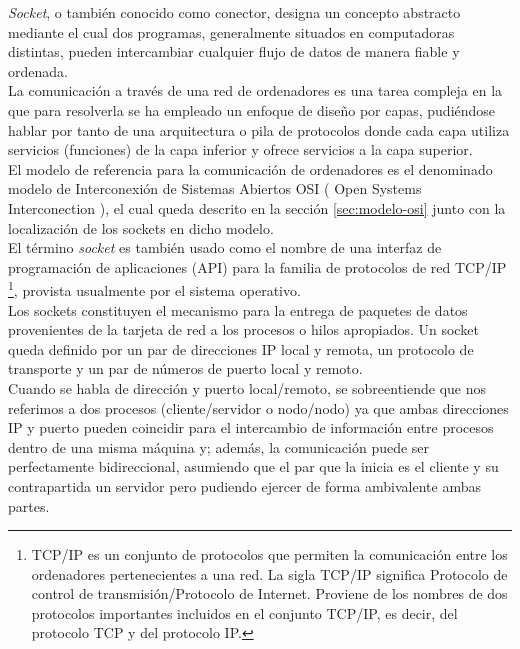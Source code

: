 \emph{Socket}, o también conocido como conector, designa un concepto abstracto mediante el cual dos programas, generalmente situados en computadoras distintas, pueden intercambiar cualquier flujo de datos
de manera fiable y ordenada.\\

La comunicación a través de una red de ordenadores es una tarea compleja en la que para resolverla se ha empleado un enfoque de diseño por capas, pudiéndose hablar por tanto de una arquitectura 
o pila de protocolos donde cada capa utiliza servicios (funciones) de la capa inferior y ofrece servicios a la capa superior. \\

El modelo de referencia para la comunicación de ordenadores es el denominado modelo de Interconexión de Sistemas Abiertos OSI ( Open Systems Interconection ), el cual queda descrito
en la sección \ref{sec:modelo-osi} junto con la localización de los sockets en dicho modelo.\\

El término \emph{socket} es también usado como el nombre de una interfaz de programación de aplicaciones (API) para la familia de protocolos de red TCP/IP \footnote{ TCP/IP es un conjunto de protocolos que
permiten la comunicación entre los ordenadores pertenecientes a una red. La sigla TCP/IP significa Protocolo de control de transmisión/Protocolo de Internet. Proviene de los nombres de dos protocolos 
importantes incluidos en el conjunto TCP/IP, es decir, del protocolo TCP y del protocolo IP. }, provista usualmente por el sistema operativo.\\

Los sockets constituyen el mecanismo para la entrega de paquetes de datos provenientes de la tarjeta de red a los procesos o hilos apropiados. Un socket queda definido por un par de direcciones IP local
y remota, un protocolo de transporte y un par de números de puerto local y remoto.\\

Cuando se habla de dirección y puerto local/remoto, se sobreentiende que nos referimos a dos procesos (cliente/servidor o nodo/nodo) ya que ambas direcciones IP y puerto pueden coincidir para el intercambio de información entre procesos dentro de una misma máquina
y; además, la comunicación puede ser perfectamente bidireccional, asumiendo que el par que la inicia es el cliente y su contrapartida un servidor pero pudiendo ejercer de forma ambivalente ambas partes.\\


